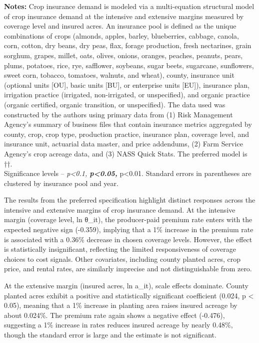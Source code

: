 \documentclass[
]{article}
\begin{document}
\textbf{Notes:} Crop insurance demand is modeled via a multi-equation
structural model of crop insurance demand at the intensive and extensive
margins measured by coverage level and insured acres. An insurance pool
is defined as the unique combinations of crops (almonds, apples, barley,
blueberries, cabbage, canola, corn, cotton, dry beans, dry peas, flax,
forage production, fresh nectarines, grain sorghum, grapes, millet,
oats, olives, onions, oranges, peaches, peanuts, pears, plums, potatoes,
rice, rye, safflower, soybeans, sugar beets, sugarcane, sunflowers,
sweet corn, tobacco, tomatoes, walnuts, and wheat), county, insurance
unit (optional units {[}OU{]}, basic units {[}BU{]}, or enterprise units
{[}EU{]}), insurance plan, irrigation practice (irrigated,
non-irrigated, or unspecified), and organic practice (organic certified,
organic transition, or unspecified). The data used was constructed by
the authors using primary data from (1) Risk Management Agency's summary
of business files that contain insurance metrics aggregated by county,
crop, crop type, production practice, insurance plan, coverage level,
and insurance unit, actuarial data master, and price addendums, (2) Farm
Service Agency's crop acreage data, and (3) NASS Quick Stats. The
preferred model is ††.\\
Significance levels -- \emph{p\textless0.1, \textbf{p\textless0.05,
}}p\textless0.01. Standard errors in parentheses are clustered by
insurance pool and year.

The results from the preferred specification highlight distinct
responses across the intensive and extensive margins of crop insurance
demand. At the intensive margin (coverage level, ln θ\_it), the
producer-paid premium rate enters with the expected negative sign
(-0.359), implying that a 1\% increase in the premium rate is associated
with a 0.36\% decrease in chosen coverage levels. However, the effect is
statistically insignificant, reflecting the limited responsiveness of
coverage choices to cost signals. Other covariates, including county
planted acres, crop price, and rental rates, are similarly imprecise and
not distinguishable from zero.

At the extensive margin (insured acres, ln a\_it), scale effects
dominate. County planted acres exhibit a positive and statistically
significant coefficient (0.024, p \textless{} 0.05), meaning that a 1\%
increase in planting area raises insured acreage by about 0.024\%. The
premium rate again shows a negative effect (-0.476), suggesting a 1\%
increase in rates reduces insured acreage by nearly 0.48\%, though the
standard error is large and the estimate is not significant.
\end{document}
